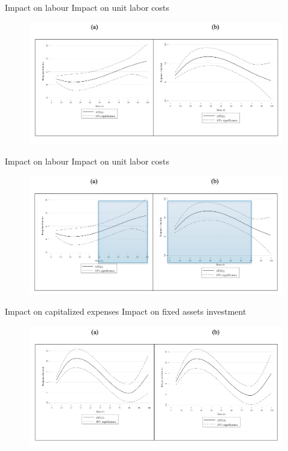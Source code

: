 \documentclass[10pt,handout,xcolor=pdftex,dvipsnames,table]{beamer}
\begin{document}
\begin{frame}{Impact on labour}
Impact on unit labor costs
\begin{figure}[t]
\centering
\includegraphics[width=1\textwidth]{./Figs/ULC.png}
\end{figure}
\end{frame}
\begin{frame}{Impact on labour}
Impact on unit labor costs
\begin{figure}[t]
\centering
\includegraphics[width=1\textwidth]{./Figs/ULCshad.png}
\end{figure}
\end{frame}
\begin{frame}{Impact on capitalized expenses}
Impact on fixed assets investment
\begin{figure}[t]
\centering
\includegraphics[width=1\textwidth]{./Figs/FA.png}
\end{figure}
\end{frame}
\end{document}
